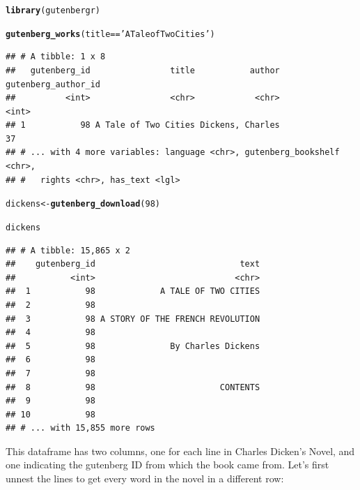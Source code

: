\documentclass{article}\usepackage[]{graphicx}\usepackage[]{color}
\makeatletter
\newcommand{\hlnum}[1]{\textcolor[rgb]{0.686,0.059,0.569}{#1}}%
\newcommand{\hlstr}[1]{\textcolor[rgb]{0.192,0.494,0.8}{#1}}%
\newcommand{\hlopt}[1]{\textcolor[rgb]{0,0,0}{#1}}%
\newcommand{\hlstd}[1]{\textcolor[rgb]{0.345,0.345,0.345}{#1}}%
\newcommand{\hlkwb}[1]{\textcolor[rgb]{0.69,0.353,0.396}{#1}}%
\newcommand{\hlkwd}[1]{\textcolor[rgb]{0.737,0.353,0.396}{\textbf{#1}}}%
\newenvironment{kframe}{%
 \def\at@end@of@kframe{}%
 \ifinner\ifhmode%
  \def\at@end@of@kframe{\end{minipage}}%
  \begin{minipage}{\columnwidth}%
 \fi\fi%
 \def\FrameCommand##1{\hskip\@totalleftmargin \hskip-\fboxsep
 \colorbox{shadecolor}{##1}\hskip-\fboxsep
     \hskip-\linewidth \hskip-\@totalleftmargin \hskip\columnwidth}%
 \MakeFramed {\advance\hsize-\width
   \@totalleftmargin\z@ \linewidth\hsize
   \@setminipage}}%
 {\par\unskip\endMakeFramed%
 \at@end@of@kframe}
\newenvironment{knitrout}{}{} %
\makeatother
\begin{document}
\begin{knitrout}
\color{fgcolor}\begin{kframe}
\begin{alltt}
\hlkwd{library}\hlstd{(gutenbergr)}
\end{alltt}


{\ttfamily\noindent\color{warningcolor}{\#\# Warning: package 'gutenbergr' was built under R version 3.4.2}}\begin{alltt}
\hlkwd{gutenberg_works}\hlstd{(title}\hlopt{==}\hlstr{'A Tale of Two Cities'}\hlstd{)}
\end{alltt}
\begin{verbatim}
## # A tibble: 1 x 8
##   gutenberg_id                title           author gutenberg_author_id
##          <int>                <chr>            <chr>               <int>
## 1           98 A Tale of Two Cities Dickens, Charles                  37
## # ... with 4 more variables: language <chr>, gutenberg_bookshelf <chr>,
## #   rights <chr>, has_text <lgl>
\end{verbatim}
\begin{alltt}
\hlstd{dickens}\hlkwb{<-}\hlkwd{gutenberg_download}\hlstd{(}\hlnum{98}\hlstd{)}

\hlstd{dickens}
\end{alltt}
\begin{verbatim}
## # A tibble: 15,865 x 2
##    gutenberg_id                             text
##           <int>                            <chr>
##  1           98             A TALE OF TWO CITIES
##  2           98                                 
##  3           98 A STORY OF THE FRENCH REVOLUTION
##  4           98                                 
##  5           98               By Charles Dickens
##  6           98                                 
##  7           98                                 
##  8           98                         CONTENTS
##  9           98                                 
## 10           98                                 
## # ... with 15,855 more rows
\end{verbatim}
\end{kframe}
\end{knitrout}

This dataframe has two columns, one for each line in Charles Dicken's Novel, and one indicating the gutenberg ID from which the book came from.  Let's first unnest the lines to get every word in the novel in a different row:
\end{document}
